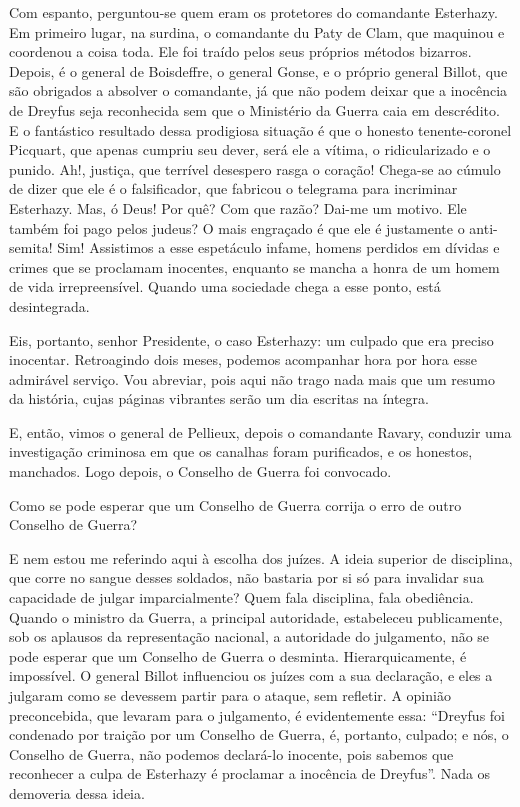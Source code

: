 Com espanto, perguntou-se quem eram os protetores do comandante
Esterhazy. Em primeiro lugar, na surdina, o comandante du Paty
de Clam, que maquinou e coordenou a coisa toda. Ele foi traído 
pelos seus próprios métodos bizarros. Depois, é o general de Boisdeffre, o
general Gonse, e o próprio general Billot, que são obrigados a absolver
o comandante, já que não podem deixar que a inocência de
Dreyfus seja reconhecida sem que o Ministério da Guerra caia em descrédito. E o
fantástico resultado dessa prodigiosa situação é que o honesto
tenente-coronel Picquart, que apenas cumpriu seu dever, será ele
a vítima, o ridicularizado e o punido. Ah!, justiça, que terrível
desespero rasga o coração! Chega-se ao cúmulo de dizer que ele é o
falsificador, que fabricou o telegrama para incriminar Esterhazy. Mas, ó
Deus! Por quê? Com que razão? Dai-me um motivo. Ele também foi pago
pelos judeus? O mais engraçado é que ele é justamente o anti-semita!
Sim! Assistimos a esse espetáculo infame, homens perdidos em dívidas e
crimes que se proclamam inocentes, enquanto se mancha a honra de um
homem de vida irrepreensível. Quando uma sociedade chega a esse ponto,
está desintegrada.

 Eis, portanto, senhor Presidente, o caso Esterhazy: um culpado que era preciso inocentar.
Retroagindo dois meses, podemos acompanhar hora
por hora esse admirável serviço. Vou abreviar, pois aqui não trago nada mais que um
resumo da história, cujas páginas vibrantes serão um dia escritas na íntegra.

E, então, vimos o general de Pellieux, depois o comandante
Ravary, conduzir uma investigação criminosa em que os canalhas foram
purificados, e os honestos, manchados. Logo depois, o Conselho de Guerra foi
convocado.

 Como se pode esperar que um Conselho de Guerra corrija o erro de outro
Conselho de Guerra?

E nem estou me referindo aqui à escolha dos juízes. A ideia superior de
disciplina, que corre no sangue desses soldados, não bastaria por si só
para invalidar sua capacidade de julgar imparcialmente? Quem fala disciplina, fala obediência. 
Quando o ministro da Guerra, a principal
autoridade, estabeleceu publicamente, sob os aplausos da representação nacional, a
autoridade do julgamento, não se pode esperar que um Conselho de Guerra
o desminta. Hierarquicamente, é impossível. O general Billot
influenciou os juízes com a sua declaração, e eles a julgaram como se devessem partir para o ataque,
sem refletir. A opinião preconcebida,
que levaram para o julgamento, é evidentemente essa: “Dreyfus foi
condenado por traição por um Conselho de Guerra, é, portanto, culpado;
e nós, o Conselho de Guerra, não podemos declará-lo inocente, pois
 sabemos que reconhecer a culpa de Esterhazy é proclamar a
inocência de Dreyfus”. Nada os demoveria dessa ideia.

